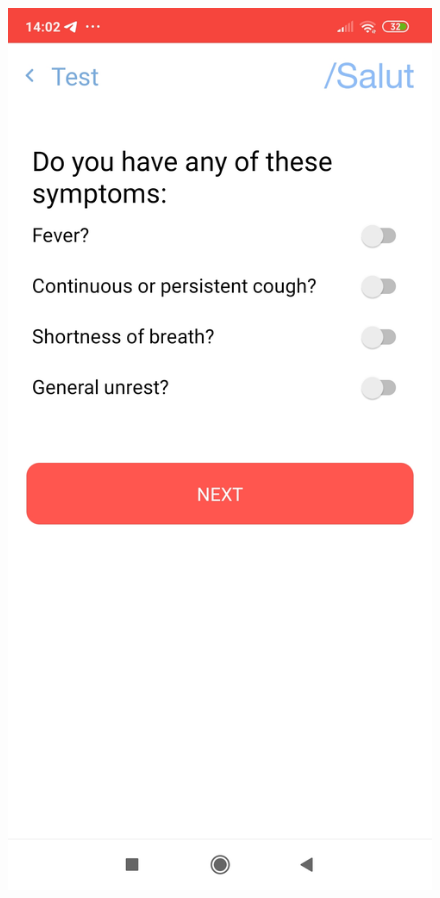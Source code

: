 \documentclass[a4paper, 12pt]{article}
\begin{document}
\begin{figure}[!htb]
\begin{minipage}{0.33\textwidth}
   \end{minipage}\hfill
   \begin{minipage}{0.33\textwidth}
     \centering
     \includegraphics[scale=0.06]{images/discussion/covid-cat-2.jpg}

\end{minipage}
\end{figure}
\end{document}
